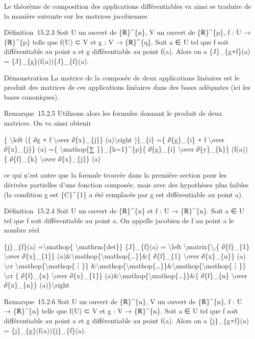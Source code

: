\documentclass[]{article}
\begin{document}
Le théorème de composition des applications différentiables va ainsi se
traduire de la manière suivante sur les matrices jacobiennes

Définition~15.2.3 Soit U un ouvert de \{ℝ\}\^{}\{n\}, V un ouvert de
\{ℝ\}\^{}\{p\}, f : U → \{ℝ\}\^{}\{p\} telle que f(U) ⊂ V et g : V →
\{ℝ\}\^{}\{q\}. Soit a ∈ U tel que f soit différentiable au point a et g
différentiable au point f(a). Alors on a \{J\}\_\{g∘f\}(a) =
\{J\}\_\{g\}(f(a))\{J\}\_\{f\}(a).

Démonstration La matrice de la composée de deux applications linéaires
est le produit des matrices de ces applications linéaires dans des bases
adéquates (ici les bases canoniques).

Remarque~15.2.5 Utilisons alors les formules donnant le produit de deux
matrices. On va ainsi obtenir

\{ \textbackslash{}left (\{ ∂g ∘ f \textbackslash{}over ∂\{x\}\_\{j\}\}
(a)\textbackslash{}right )\}\_\{i\} =\{ ∂\{g\}\_\{i\} ∘ f
\textbackslash{}over ∂\{x\}\_\{j\}\} (a) =\{ \textbackslash{}mathop\{∑
\}\}\_\{k=1\}\^{}\{p\}\{ ∂\{g\}\_\{i\} \textbackslash{}over
∂\{y\}\_\{k\}\} (f(a))\{ ∂\{f\}\_\{k\} \textbackslash{}over
∂\{x\}\_\{j\}\} (a)

ce qui n'est autre que la formule trouvée dans la première section pour
les dérivées partielles d'une fonction composée, mais avec des
hypothèses plus faibles (la condition g est \{C\}\^{}\{1\} a été
remplacée par g est différentiable au point a).

Définition~15.2.4 Soit U un ouvert de \{ℝ\}\^{}\{n\} et f : U →
\{ℝ\}\^{}\{n\}. Soit a ∈ U tel que f soit différentiable au point a. On
appelle jacobien de f au point a le nombre réel

\{j\}\_\{f\}(a) =\textbackslash{}mathop\{
\textbackslash{}mathrm\{det\}\} \{J\}\_\{f\}(a) = \textbackslash{}left
\textbar{}\textbackslash{}matrix\{\textbackslash{},\{ ∂\{f\}\_\{1\}
\textbackslash{}over ∂\{x\}\_\{1\}\}
(a)\&\textbackslash{}mathop\{\textbackslash{}mathop\{\ldots{}\}\}\&\{
∂\{f\}\_\{1\} \textbackslash{}over ∂\{x\}\_\{n\}\} (a)
\textbackslash{}cr \textbackslash{}mathop\{\textbackslash{}mathop\{⋮\}\}
\&\textbackslash{}mathop\{\textbackslash{}mathop\{\ldots{}\}\}\&\textbackslash{}mathop\{\textbackslash{}mathop\{⋮\}\}
\textbackslash{}cr \{ ∂\{f\}\_\{n\} \textbackslash{}over ∂\{x\}\_\{1\}\}
(a)\&\textbackslash{}mathop\{\textbackslash{}mathop\{\ldots{}\}\}\&\{
∂\{f\}\_\{n\} \textbackslash{}over ∂\{x\}\_\{n\}\}
(a)\}\textbackslash{}right \textbar{}

Remarque~15.2.6 Soit U un ouvert de \{ℝ\}\^{}\{n\}, V un ouvert de
\{ℝ\}\^{}\{n\}, f : U → \{ℝ\}\^{}\{n\} telle que f(U) ⊂ V et g : V →
\{ℝ\}\^{}\{n\}. Soit a ∈ U tel que f soit différentiable au point a et g
différentiable au point f(a). Alors on a \{j\}\_\{g∘f\}(a) =
\{j\}\_\{g\}(f(a))\{j\}\_\{f\}(a).
\end{document}
